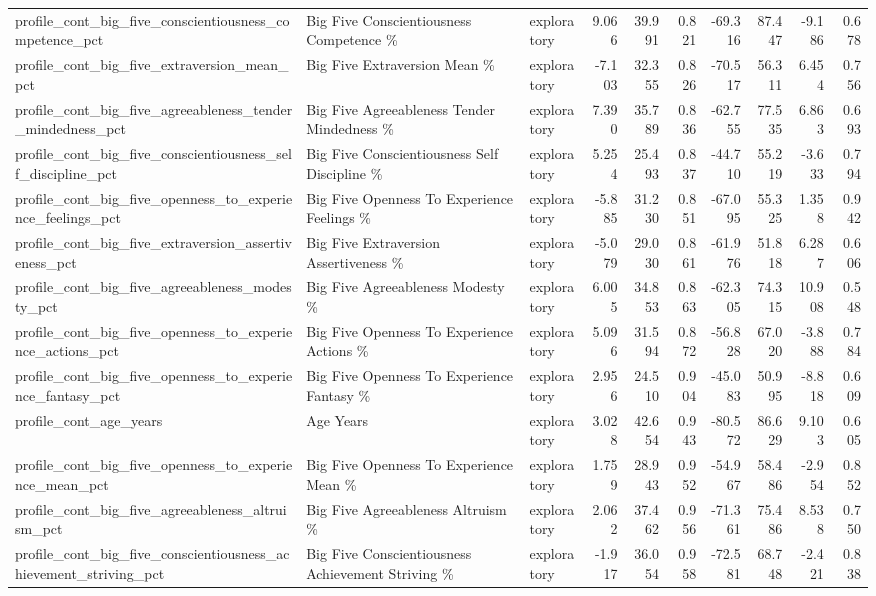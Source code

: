 \begin{table}[htbp]
\begin{threeparttable}
\begin{tabular}{lllrrrrrrr}
profile\_cont\_big\_five\_conscientiousness\_competence\_pct & Big Five Conscientiousness Competence \% & exploratory & 9.066 & 39.991 & 0.821 & -69.316 & 87.447 & -9.186 & 0.678 \\
profile\_cont\_big\_five\_extraversion\_mean\_pct & Big Five Extraversion Mean \% & exploratory & -7.103 & 32.355 & 0.826 & -70.517 & 56.311 & 6.454 & 0.756 \\
profile\_cont\_big\_five\_agreeableness\_tender\_mindedness\_pct & Big Five Agreeableness Tender Mindedness \% & exploratory & 7.390 & 35.789 & 0.836 & -62.755 & 77.535 & 6.863 & 0.693 \\
profile\_cont\_big\_five\_conscientiousness\_self\_discipline\_pct & Big Five Conscientiousness Self Discipline \% & exploratory & 5.254 & 25.493 & 0.837 & -44.710 & 55.219 & -3.633 & 0.794 \\
profile\_cont\_big\_five\_openness\_to\_experience\_feelings\_pct & Big Five Openness To Experience Feelings \% & exploratory & -5.885 & 31.230 & 0.851 & -67.095 & 55.325 & 1.358 & 0.942 \\
profile\_cont\_big\_five\_extraversion\_assertiveness\_pct & Big Five Extraversion Assertiveness \% & exploratory & -5.079 & 29.030 & 0.861 & -61.976 & 51.818 & 6.287 & 0.606 \\
profile\_cont\_big\_five\_agreeableness\_modesty\_pct & Big Five Agreeableness Modesty \% & exploratory & 6.005 & 34.853 & 0.863 & -62.305 & 74.315 & 10.908 & 0.548 \\
profile\_cont\_big\_five\_openness\_to\_experience\_actions\_pct & Big Five Openness To Experience Actions \% & exploratory & 5.096 & 31.594 & 0.872 & -56.828 & 67.020 & -3.888 & 0.784 \\
profile\_cont\_big\_five\_openness\_to\_experience\_fantasy\_pct & Big Five Openness To Experience Fantasy \% & exploratory & 2.956 & 24.510 & 0.904 & -45.083 & 50.995 & -8.818 & 0.609 \\
profile\_cont\_age\_years & Age Years & exploratory & 3.028 & 42.654 & 0.943 & -80.572 & 86.629 & 9.103 & 0.605 \\
profile\_cont\_big\_five\_openness\_to\_experience\_mean\_pct & Big Five Openness To Experience Mean \% & exploratory & 1.759 & 28.943 & 0.952 & -54.967 & 58.486 & -2.954 & 0.852 \\
profile\_cont\_big\_five\_agreeableness\_altruism\_pct & Big Five Agreeableness Altruism \% & exploratory & 2.062 & 37.462 & 0.956 & -71.361 & 75.486 & 8.538 & 0.750 \\
profile\_cont\_big\_five\_conscientiousness\_achievement\_striving\_pct & Big Five Conscientiousness Achievement Striving \% & exploratory & -1.917 & 36.054 & 0.958 & -72.581 & 68.748 & -2.421 & 0.838 \\

\end{tabular}
\end{threeparttable}
\end{table}
